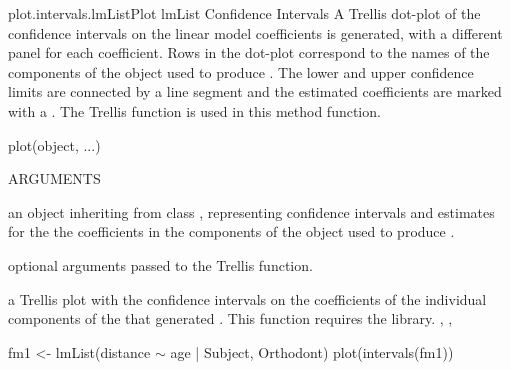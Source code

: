 \documentclass[pdftex]{article} \usepackage{url,graphicx}
\renewcommand{\Twiddle}{\mbox{\(\sim\)}}
\begin{document}
\begin{Helpfile}{plot.intervals.lmList}{Plot lmList Confidence Intervals}
A Trellis dot-plot of the confidence intervals on the linear model
coefficients is generated, with a different panel for each
coefficient. Rows in the dot-plot correspond to the names of the
 components of the  object used to produce
. The lower and upper confidence limits are connected by
a line segment and the estimated coefficients are marked with a
. The Trellis function  is used in this method
function.
\begin{Example}
plot(object, ...)
\end{Example}
\begin{Argument}{ARGUMENTS}
\item[\Co{object:}]
an object inheriting from class ,
representing confidence intervals and estimates for the the
coefficients in the  components of the  object
used to produce .
\item[\Co{...:}]
optional arguments passed to the Trellis 
function.
\end{Argument}
a Trellis plot with the confidence intervals on the coefficients of
the individual  components of the  that
generated .
 This function requires the  library.
, ,
\need 15pt
\vspace{-16pt}
\begin{Example}
fm1 <- lmList(distance {\Twiddle} age | Subject, Orthodont)
plot(intervals(fm1))
\end{Example}
\end{Helpfile}
\end{document}
